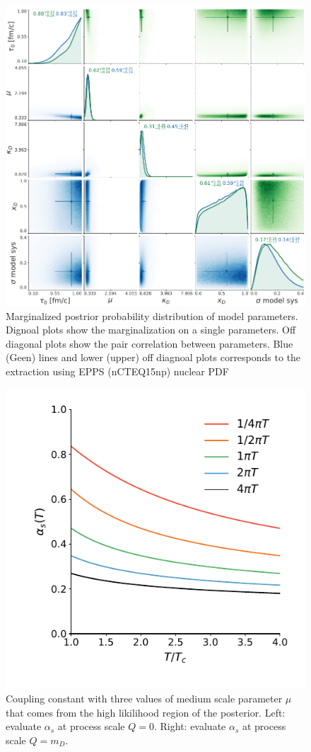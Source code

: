 \documentclass[aps, prc, reprint, amsmath, groupedaddress, nofootinbib]{revtex4-1}
\begin{document}
\begin{figure}
\includegraphics[width=.5\textwidth]{posterior.pdf}
\caption{Marginalized postrior probability distribution of model parameters. Dignoal plots show the marginalization on a single parameters. Off diagonal plots show the pair correlation between parameters. Blue (Geen) lines and lower (upper) off diagnoal plots corresponds to the extraction using EPPS (nCTEQ15np) nuclear PDF}\label{plots:posterior}
\end{figure}
\begin{figure}
\includegraphics[width=.5\textwidth]{alpha_s_at_T.pdf}
\caption{Coupling constant with three values of medium scale parameter $\mu$ that comes from the high likilihood region of the posterior. Left: evaluate $\alpha_s$ at process scale $Q=0$. Right: evaluate $\alpha_s$ at process scale $Q=m_D$.}\label{plots:alphas}
\end{figure}
\end{document}
